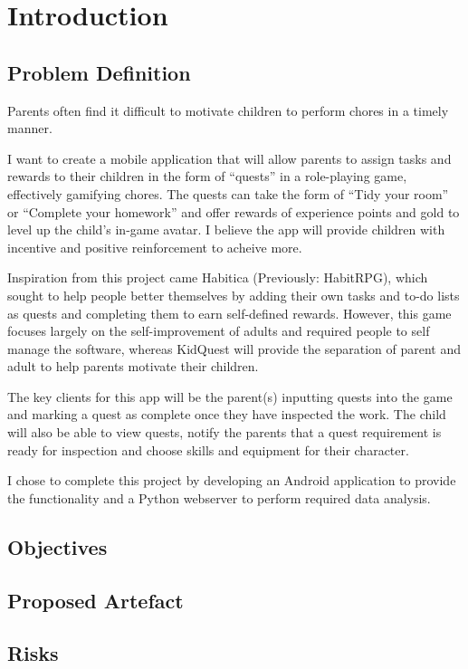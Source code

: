 
\chapter{Introduction}
\label{chap:intro}

\section{Problem Definition}
Parents often find it difficult to motivate children to perform chores in a timely manner.

I want to create a mobile application that will allow parents to assign tasks and rewards to their children in the form of ``quests'' in a role-playing game, effectively gamifying chores. 
The quests can take the form of “Tidy your room” or “Complete your homework” and offer rewards of experience points and gold to level up the child's in-game avatar. 
I believe the app will provide children with incentive and positive reinforcement to acheive more.

Inspiration from this project came Habitica (Previously: HabitRPG), which sought to help people better themselves by adding their own tasks and to-do lists as quests and completing them to earn self-defined rewards. 
However, this game focuses largely on the self-improvement of adults and required people to self manage the software, whereas KidQuest will provide the separation of parent and adult to help parents motivate their children.

The key clients for this app will be the parent(s) inputting quests into the game and marking a quest as complete once they have inspected the work. 
The child will also be able to view quests, notify the parents that a quest requirement is ready for inspection and choose skills and equipment for their character. 

I chose to complete this project by developing an Android application to provide the functionality and a Python webserver to perform required data analysis.

\section{Objectives}

\section{Proposed Artefact}

\section{Risks}